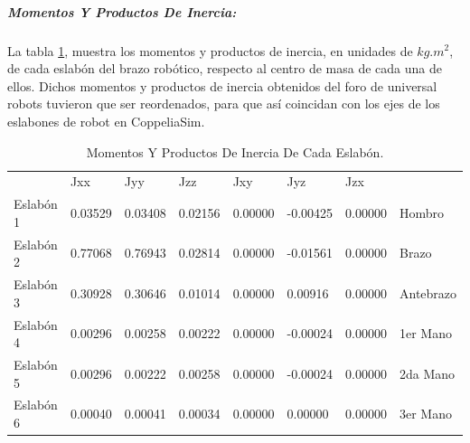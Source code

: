 \documentclass{article}
\begin{document}
\begin{sloppypar}
\subparagraph{Momentos Y Productos De Inercia:}
\label{sec:Momentos Y Productos De Inercia:}
\hfill \break
La tabla \ref{table:Momentos Y Productos De Inercia De Cada Eslabón}, muestra los momentos y productos de inercia, en unidades de $kg.m^2$, de cada eslabón del brazo robótico, respecto al centro de masa de cada una de ellos.
Dichos momentos y productos de inercia obtenidos del foro de universal robots tuvieron que ser reordenados, para que así coincidan con los ejes de los eslabones de robot en CoppeliaSim. %
\begin{table}[H]
\begin{center}
\begin{tabular}{l|lll|lll|l}
\cline{2-7}
            & Jxx     & Jyy     & Jzz     & Jxy     & Jyz      & Jzx     &            \\ \cline{2-7}
Eslabón 1 & 0.03529 & 0.03408 & 0.02156 & 0.00000 & -0.00425 & 0.00000 & Hombro       \\
Eslabón 2 & 0.77068 & 0.76943 & 0.02814 & 0.00000 & -0.01561 & 0.00000 & Brazo        \\
Eslabón 3 & 0.30928 & 0.30646 & 0.01014 & 0.00000 & 0.00916  & 0.00000 & Antebrazo    \\
Eslabón 4 & 0.00296 & 0.00258 & 0.00222 & 0.00000 & -0.00024 & 0.00000 & 1er Mano  \\
Eslabón 5 & 0.00296 & 0.00222 & 0.00258 & 0.00000 & -0.00024 & 0.00000 & 2da Mano \\
Eslabón 6 & 0.00040 & 0.00041 & 0.00034 & 0.00000 & 0.00000  & 0.00000 & 3er Mano  \\ \cline{2-7}
\end{tabular}
\caption{\label{table:Momentos Y Productos De Inercia De Cada Eslabón}Momentos Y Productos De Inercia De Cada Eslabón.}
\end{center}
\end{table}



\end{sloppypar}
\end{document}
